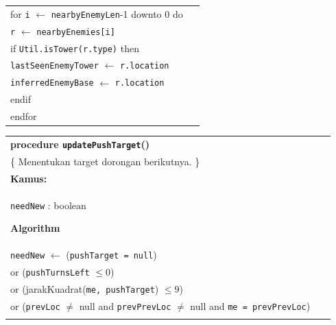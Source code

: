 \documentclass{article}
\newenvironment{pseudobox}
{
\centering
\begin{longtable}{|p{0.94\linewidth}|}
\hline
}
{
\\ \hline
\end{longtable}
\vspace{0.05cm}
}
\begin{document}
\begin{enumerate}[label=\alph*.]
\begin{enumerate}[label=\alph*.]
\begin{pseudobox}
\hspace*{1.5em}for \texttt{i} $\leftarrow$ \texttt{nearbyEnemyLen}-1 downto 0 do \\
\hspace*{3em}\texttt{r} $\leftarrow$ \texttt{nearbyEnemies[i]} \\
\hspace*{3em}if \texttt{Util.isTower(r.type)} then \\
\hspace*{4.5em}\texttt{lastSeenEnemyTower} $\leftarrow$ \texttt{r.location} \\
\hspace*{4.5em}\texttt{inferredEnemyBase} $\leftarrow$ \texttt{r.location} \\
\hspace*{3em}endif \\
\hspace*{1.5em}endfor
\end{pseudobox}

\begin{pseudobox}
\textbf{procedure \texttt{updatePushTarget}()} \\
\{ Menentukan target dorongan berikutnya. \} \\

\textbf{Kamus:} \\
\hspace*{1.5em}\texttt{needNew} : boolean

\textbf{Algorithm} \\
\hspace*{1.5em}\texttt{needNew} $\leftarrow$ (\texttt{pushTarget = null}) \\
\hspace*{4.5em}or (\texttt{pushTurnsLeft} $\leq 0$) \\
\hspace*{4.5em}or (jarakKuadrat(\texttt{me, pushTarget}) $\leq 9$) \\
\hspace*{4.5em}or (\texttt{prevLoc} $\neq$ null and \texttt{prevPrevLoc} $\neq$ null and \texttt{me = prevPrevLoc}) \\


\end{pseudobox}
\end{enumerate}
\end{enumerate}
\end{document}
